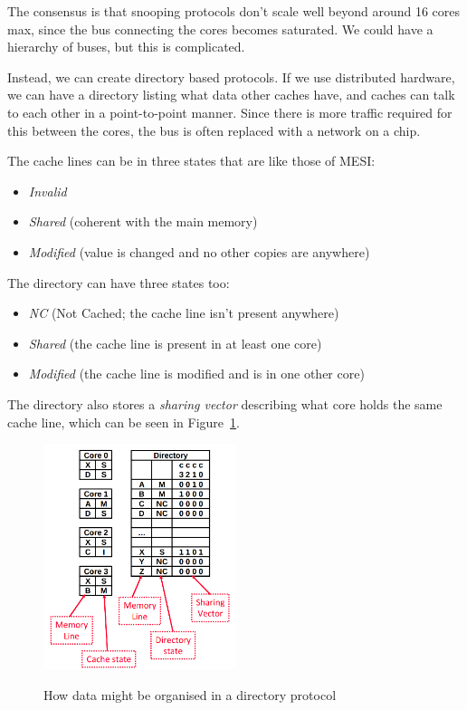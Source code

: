 The consensus is that snooping protocols don't scale well beyond around 16 cores
max, since the bus connecting the cores becomes saturated. We could have a
hierarchy of buses, but this is complicated.

Instead, we can create directory based protocols. If we use distributed
hardware, we can have a directory listing what data other caches have, and
caches can talk to each other in a point-to-point manner. Since there is more
traffic required for this between the cores, the bus is often replaced with a
network on a chip.

The cache lines can be in three states that are like those of MESI:

\begin{itemize}
  \item \textit{Invalid}
  \item \textit{Shared} (coherent with the main memory)
  \item \textit{Modified} (value is changed and no other copies are anywhere)
\end{itemize}

The directory can have three states too:

\begin{itemize}
  \item \textit{NC} (Not Cached; the cache line isn't present anywhere)
  \item \textit{Shared} (the cache line is present in at least one core)
  \item \textit{Modified} (the cache line is modified and is in one other core)
\end{itemize}

The directory also stores a \textit{sharing vector} describing what core holds
the same cache line, which can be seen in Figure~\ref{directory-protocol}.

\begin{figure}[H]
  \centering
  \includegraphics[width=0.5\textwidth]{images/directory-protocol}
  \label{directory-protocol}
  \caption{How data might be organised in a directory protocol}
\end{figure}

